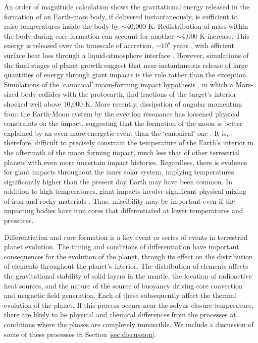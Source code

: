 An order of magnitude calculation shows the gravitational energy released in the
formation of an Earth-mass body, if delivered instantaneously, is sufficient to raise
temperatures inside the body by $\sim$40,000 K.  Redistribution of mass within the body
during core formation can account for another $\sim$4,000 K increase. This energy is
released over the timescale of accretion, $\sim$$10^{8}$ years \citep{Chambers1998}, with
efficient surface heat loss through a liquid-atmosphere interface
\citep{Abe1997,Elkins-Tanton2012}. However, simulations of the final stages of planet
growth \citep{Cameron1991,Chambers1998,Canup2000} suggest that near-instantaneous release
of large quantities of energy through giant impacts is  the rule rather than the
exception.  Simulations of the `canonical' moon-forming impact hypothesis
\citep{Canup2004}, in which a Mars-sized body collides with the protoearth, find fractions
of the target's interior shocked well above 10,000 K. More recently, dissipation of
angular momentum from the Earth-Moon system by the evection resonance has loosened
physical constraints on the impact, suggesting that the formation of the moon is better
explained by an even more energetic event than the `canonical' one \citep{Canup2012,Cuk2012}.
It is, therefore, difficult to precisely constrain the temperature of the Earth's
interior in the aftermath of the moon forming impact, much less that of other terrestrial
planets with even more uncertain impact histories. Regardless, there is evidence for
giant impacts throughout the inner solar system, implying temperatures significantly
higher than the present day Earth may have been common. In addition to high temperatures,
giant impacts involve significant physical mixing of iron and rocky materials
\citep{Dahl2010}.  Thus, miscibility may be important even if the impacting bodies have
iron cores that differentiated at lower temperatures and pressures.

Differentiation and core formation is a key event or series of events in terrestrial
planet evolution. The timing and conditions of differentiation have important
consequences for the evolution of the planet, through its effect on the distribution of
elements throughout the planet's interior. The distribution of elements affects the
gravitational stability of solid layers in the mantle, the location of radioactive heat
sources, and the nature of the source of buoyancy driving core convection and magnetic
field generation. Each of these subsequently affect the thermal evolution of the planet.
If this process occurs near the solvus closure temperature, there are likely to be
physical and chemical differences from the processes at conditions where the phases are
completely immiscible. We include a discussion of some of these processes in Section
\ref{sec:discussion}.

